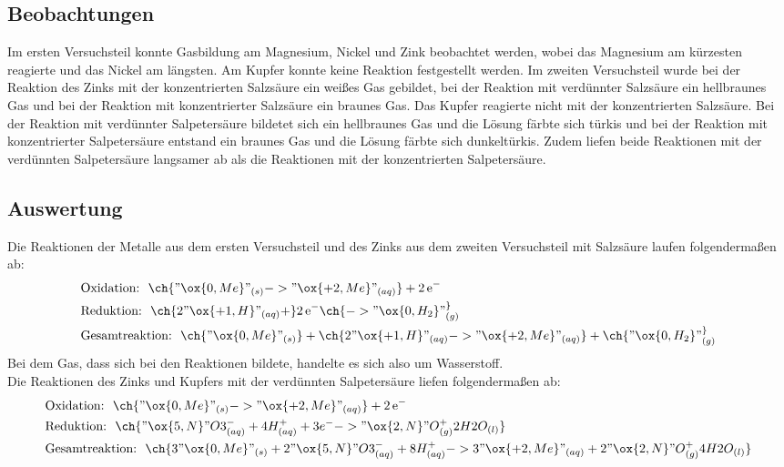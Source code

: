 \documentclass[12pt]{scrartcl} %
\begin{document}
\subsection{Beobachtungen}
Im ersten Versuchsteil konnte Gasbildung am Magnesium, Nickel und Zink beobachtet werden, wobei das Magnesium am kürzesten reagierte und das Nickel am längsten. Am Kupfer konnte keine Reaktion festgestellt werden.\newpage
Im zweiten Versuchsteil wurde bei der Reaktion des Zinks mit der konzentrierten Salzsäure ein weißes Gas gebildet, bei der Reaktion mit verdünnter Salzsäure ein hellbraunes Gas und bei der Reaktion mit konzentrierter Salzsäure ein braunes Gas. Das Kupfer reagierte nicht mit der konzentrierten Salzsäure. Bei der Reaktion mit verdünnter Salpetersäure bildetet sich ein hellbraunes Gas und die Lösung färbte sich türkis und bei der Reaktion mit konzentrierter Salpetersäure entstand ein braunes Gas und die Lösung färbte sich dunkeltürkis. Zudem liefen beide Reaktionen mit der verdünnten Salpetersäure langsamer ab als die Reaktionen mit der konzentrierten Salpetersäure.



\subsection{Auswertung}
Die Reaktionen der Metalle aus dem ersten Versuchsteil und des Zinks aus dem zweiten Versuchsteil mit Salzsäure laufen folgendermaßen ab: 
\begin{align}\notag
    &\text{Oxidation:} ~~ \ch{"\ox{0,Me}" _{(s)} -> "\ox{+2,Me}" _{(aq)}} \ce{ + 2e^-}\\\notag
    &\text{Reduktion:} ~~ \ch{2 "\ox{+1,H}" _{(aq)} +}\ce{2e^-} \ch{-> "\ox{0,H_2}" _{(g)} ^}\\\notag
    &\text{Gesamtreaktion:} ~~ \ch{"\ox{0,Me}" _{(s)}} + \ch{2 "\ox{+1,H}" _{(aq)} -> "\ox{+2,Me}" _{(aq)}} + \ch{"\ox{0,H_2}" _{(g)} ^}\\
\end{align}
Bei dem Gas, dass sich bei den Reaktionen bildete, handelte es sich also um Wasserstoff.\\

Die Reaktionen des Zinks und Kupfers mit der verdünnten Salpetersäure liefen folgendermaßen ab: 
\begin{align}\notag
    &\text{Oxidation:} ~~ \ch{"\ox{0,Me}" _{(s)} -> "\ox{+2,Me}" _{(aq)}} \ce{ + 2e^-}\\\notag
    &\text{Reduktion:} ~~ \ch{"\ox{5,N}" {}O3^{-}_{(aq)} + 4 H^+_{(aq)} + 3 e^{-} -> "\ox{2,N}" O{}_{(g)} ^ + 2 H2O_{(l)}}\\ \notag
    &\text{Gesamtreaktion:} ~~ \ch{3 "\ox{0,Me}" _{(s)} + 2 "\ox{5,N}" {}O3^{-}_{(aq)} + 8 H^+_{(aq)} -> 3 "\ox{+2,Me}" _{(aq)} + 2 "\ox{2,N}" O{}_{(g)} ^ + 4 H2O_{(l)}}\\
\end{align}
\end{document}
